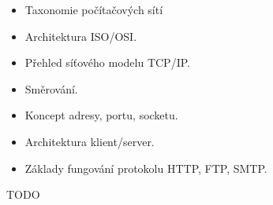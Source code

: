 \begin{itemize}
\item Taxonomie počítačových sítí
\item Architektura ISO/OSI.
\item Přehled síťového modelu TCP/IP.
\item Směrování.
\item Koncept adresy, portu, socketu.
\item Architektura klient/server.
\item Základy fungování protokolu HTTP, FTP, SMTP.
\end{itemize}

TODO
